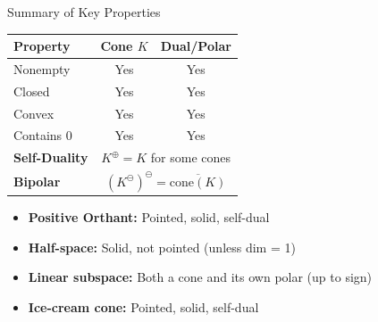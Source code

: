 \documentclass[aspectratio=169,10pt]{beamer}
\begin{document}
\begin{frame}{Summary of Key Properties}
\begin{center}
\begin{tabular}{|l|c|c|}
\hline
\textbf{Property} & \textbf{Cone $K$} & \textbf{Dual/Polar} \\
\hline
Nonempty & Yes & Yes \\
Closed & Yes & Yes \\
Convex & Yes & Yes \\
Contains 0 & Yes & Yes \\
\hline
\textbf{Self-Duality} & \multicolumn{2}{c|}{$K^{\oplus} = K$ for some cones} \\
\hline
\textbf{Bipolar} & \multicolumn{2}{c|}{$(K^{\ominus})^{\ominus} = \overline{\text{cone}(K)}$} \\
\hline
\end{tabular}
\end{center}

\vspace{0.5cm}

\begin{itemize}
    \item \textbf{Positive Orthant:} Pointed, solid, self-dual
    \item \textbf{Half-space:} Solid, not pointed (unless dim = 1)
    \item \textbf{Linear subspace:} Both a cone and its own polar (up to sign)
    \item \textbf{Ice-cream cone:} Pointed, solid, self-dual
\end{itemize}
\end{frame}
\end{document}
